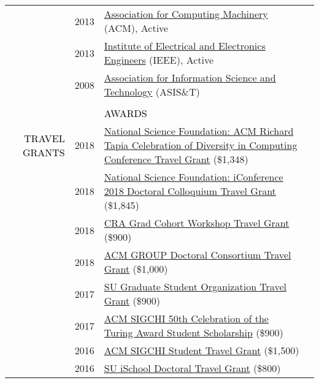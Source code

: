 \documentclass[12pt]{article}
\begin{document}
{{\begin{longtable}{Rp{1.0in}p{0.25in}p{4.75in}}
& \footnotesize{2013} & \href{https://www.acm.org/}{{Association for Computing Machinery}} (ACM), Active \\

& \footnotesize{2013} & \href{https://www.ieee.org/}{{Institute of Electrical and Electronics Engineers}} (IEEE), Active \\

& \footnotesize{2008} & \href{https://www.asist.org/}{{Association for Information Science and Technology}} (ASIS\&T)
\\
\\
&&\par \Large \textcolor{black}{\uppercase{Awards}}\\ \hhline{~~-}

\textcolor{black}{\footnotesize{\uppercase{Travel Grants}}} & \footnotesize{2018} & \href{https://www.nsf.gov/awardsearch/showAward?AWD_ID=1823052}{{National Science Foundation: ACM Richard Tapia Celebration of Diversity in Computing Conference Travel Grant}} (\$1,348) \\

& \footnotesize{2018} & \href{https://www.nsf.gov/awardsearch/showAward?AWD_ID=1713738}{{National Science Foundation: iConference 2018 Doctoral Colloquium Travel Grant}} (\$1,845) \\

& \footnotesize{2018} & \href{https://cra.org/events/urmgradcohort/}{{CRA Grad Cohort Workshop Travel Grant}} (\$900) \\

& \footnotesize{2018} & \href{https://dl.acm.org/citation.cfm?id=3148330}{{ACM GROUP Doctoral Consortium Travel Grant}} (\$1,000) \\

& \footnotesize{2017} & \href{http://gradorg.syr.edu/}{{SU Graduate Student Organization Travel Grant}} (\$900) \\

& \footnotesize{2017} & \href{https://sigchi.org/2017/03/sigchi-sponsors-students-to-attend-turing-award-celebration/}{{ACM SIGCHI 50th Celebration of the Turing Award Student Scholarship}} (\$900) \\

& \footnotesize{2016} & \href{https://sigchi.org/conferences/student-travel-grants/sigchi-student-travel-grant/}{{ACM SIGCHI Student Travel Grant}} (\$1,500) \\

& \footnotesize{2016} & \href{https://ischool.syr.edu/research/grants-and-awards/}{{SU iSchool Doctoral Travel Grant}} (\$800) \\


\end{longtable}}}
\end{document}
